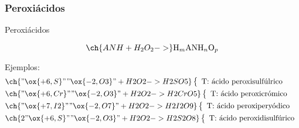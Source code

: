 \subsubsection*{Peroxiácidos}
\begin{Theorem*} {Peroxiácidos}
	\begin{figure}[H]
		\centering
	\end{figure}
	$$\ch{ANH + H_2O_2 ->}\mathrm{H}_m\mathrm{ANH}_n\mathrm{O}_p$$
\end{Theorem*}
\noindent Ejemplos:
\begin{align*}
	&\ch{"\ox{+6,S}" "\ox{-2,O3}" + H2O2 -> H2SO5}\left\{\begin{array}{l}
		\text{T: ácido peroxisulfúlrico}
	\end{array}\right. \\
	&\ch{"\ox{+6,Cr}" "\ox{-2,O3}" + H2O2 -> H2CrO5}\left\{\begin{array}{l}
		\text{T: ácido peroxicrómico}
	\end{array}\right. \\
	&\ch{"\ox{+7,I2}" "\ox{-2,O7}" + H2O2 -> H2I2O9}\left\{\begin{array}{l}
		\text{T: ácido peroxiperyódico}
	\end{array}\right. \\
	&\ch{2 "\ox{+6,S}" "\ox{-2,O3}" + H2O2 -> H2S2O8}\left\{\begin{array}{l}
		\text{T: ácido peroxidisulfúrico}
	\end{array}\right. \\
\end{align*}

